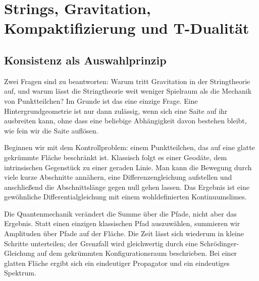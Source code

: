 \chapter{Strings, Gravitation, Kompaktifizierung und T-Dualität}


\section{Konsistenz als Auswahlprinzip}

Zwei Fragen sind zu beantworten: Warum tritt Gravitation in der Stringtheorie auf, und warum lässt die Stringtheorie weit weniger Spielraum als die Mechanik von Punktteilchen? Im Grunde ist das eine einzige Frage. Eine Hintergrundgeometrie ist nur dann zulässig, wenn sich eine Saite auf ihr ausbreiten kann, ohne dass eine beliebige Abhängigkeit davon bestehen bleibt, wie fein wir die Saite auflösen.

Beginnen wir mit dem Kontrollproblem: einem Punktteilchen, das auf eine glatte gekrümmte Fläche beschränkt ist. Klassisch folgt es einer Geodäte, dem intrinsischen Gegenstück zu einer geraden Linie. Man kann die Bewegung durch viele kurze Abschnitte annähern, eine Differenzengleichung aufstellen und anschließend die Abschnittslänge gegen null gehen lassen. Das Ergebnis ist eine gewöhnliche Differentialgleichung mit einem wohldefinierten Kontinuumslimes.

Die Quantenmechanik verändert die Summe über die Pfade, nicht aber das Ergebnis. Statt einen einzigen klassischen Pfad auszuwählen, summieren wir Amplituden über Pfade auf der Fläche. Die Zeit lässt sich wiederum in kleine Schritte unterteilen; der Grenzfall wird gleichwertig durch eine Schr\"odinger-Gleichung auf dem gekrümmten Konfigurationsraum beschrieben. Bei einer glatten Fläche ergibt sich ein eindeutiger Propagator und ein eindeutiges Spektrum.

